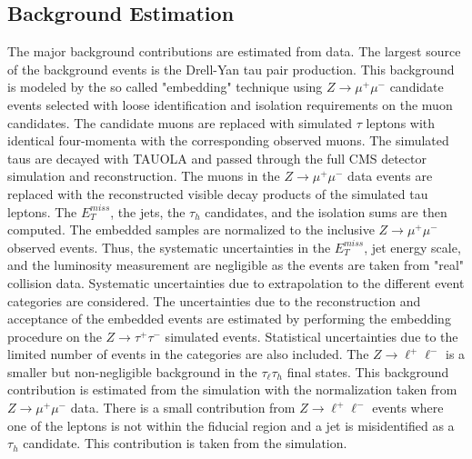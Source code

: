\subsection{Background Estimation}

The major background contributions are estimated from data. The largest source of the background events is the Drell-Yan tau pair production. This background is modeled by the so called "embedding" technique using $Z \rightarrow \mu^{+}\mu^{-}$ candidate events selected with loose identification and isolation requirements on the muon candidates.  The candidate muons are replaced with simulated $\tau$ leptons with identical four-momenta with the corresponding observed muons.  The simulated taus are decayed with TAUOLA and passed through the full CMS detector simulation and reconstruction. The muons in the $Z \rightarrow \mu^{+}\mu^{-}$ data events are replaced with the reconstructed visible decay products of the simulated tau leptons. The $E_{T}^{miss}$, the jets, the $\tau_h$ candidates, and the isolation sums are then computed. The embedded samples are normalized to the inclusive $Z\rightarrow \mu^{+}\mu^{-}$ observed events.  Thus, the systematic uncertainties in the $E_{T}^{miss}$, jet energy scale, and the luminosity measurement are negligible as the events are taken from "real" collision data. Systematic uncertainties due to extrapolation to the different event categories are considered. The uncertainties due to the reconstruction and acceptance of the embedded events are estimated by performing the embedding procedure on the $Z\rightarrow\tau^{+}\tau^{-}$ simulated events. Statistical uncertainties due to the limited number of events in the categories are also included.  The $Z\rightarrow \ell^{+}\ell^{-}$ is a smaller but non-negligible background in the $\tau_{\ell}\tau_h$ final states. This background contribution is estimated from the simulation with the normalization taken from $Z\rightarrow \mu^{+}\mu^{-}$ data. There is a small contribution from $Z\rightarrow \ell^{+}\ell^{-}$ events where one of the leptons is not within the fiducial region and a jet is misidentified as a $\tau_h$ candidate. This contribution is taken from the simulation.  

